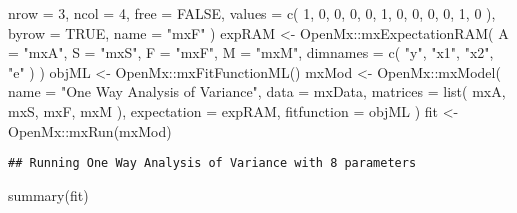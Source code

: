 \documentclass[
]{book}
\newenvironment{Shaded}{\begin{snugshade}}{\end{snugshade}}
\newcommand{\AttributeTok}[1]{\textcolor[rgb]{0.77,0.63,0.00}{#1}}
\newcommand{\ConstantTok}[1]{\textcolor[rgb]{0.00,0.00,0.00}{#1}}
\newcommand{\DecValTok}[1]{\textcolor[rgb]{0.00,0.00,0.81}{#1}}
\newcommand{\FunctionTok}[1]{\textcolor[rgb]{0.00,0.00,0.00}{#1}}
\newcommand{\NormalTok}[1]{#1}
\newcommand{\OtherTok}[1]{\textcolor[rgb]{0.56,0.35,0.01}{#1}}
\newcommand{\SpecialCharTok}[1]{\textcolor[rgb]{0.00,0.00,0.00}{#1}}
\newcommand{\StringTok}[1]{\textcolor[rgb]{0.31,0.60,0.02}{#1}}
\theoremstyle{definition}
\theoremstyle{definition}
\theoremstyle{definition}
\theoremstyle{remark}
\begin{document}
\begin{Shaded}
\begin{Highlighting}[]
  \AttributeTok{nrow =} \DecValTok{3}\NormalTok{,}
  \AttributeTok{ncol =} \DecValTok{4}\NormalTok{,}
  \AttributeTok{free =} \ConstantTok{FALSE}\NormalTok{,}
  \AttributeTok{values =} \FunctionTok{c}\NormalTok{(}
    \DecValTok{1}\NormalTok{, }\DecValTok{0}\NormalTok{, }\DecValTok{0}\NormalTok{, }\DecValTok{0}\NormalTok{,}
    \DecValTok{0}\NormalTok{, }\DecValTok{1}\NormalTok{, }\DecValTok{0}\NormalTok{, }\DecValTok{0}\NormalTok{,}
    \DecValTok{0}\NormalTok{, }\DecValTok{0}\NormalTok{, }\DecValTok{1}\NormalTok{, }\DecValTok{0}
\NormalTok{  ),}
  \AttributeTok{byrow =} \ConstantTok{TRUE}\NormalTok{,}
  \AttributeTok{name =} \StringTok{"mxF"}
\NormalTok{)}
\NormalTok{expRAM }\OtherTok{\textless{}{-}}\NormalTok{ OpenMx}\SpecialCharTok{::}\FunctionTok{mxExpectationRAM}\NormalTok{(}
  \AttributeTok{A =} \StringTok{"mxA"}\NormalTok{,}
  \AttributeTok{S =} \StringTok{"mxS"}\NormalTok{,}
  \AttributeTok{F =} \StringTok{"mxF"}\NormalTok{,}
  \AttributeTok{M =} \StringTok{"mxM"}\NormalTok{,}
  \AttributeTok{dimnames =} \FunctionTok{c}\NormalTok{(}
    \StringTok{"y"}\NormalTok{,}
    \StringTok{"x1"}\NormalTok{,}
    \StringTok{"x2"}\NormalTok{,}
    \StringTok{"e"}
\NormalTok{  )}
\NormalTok{)}
\NormalTok{objML }\OtherTok{\textless{}{-}}\NormalTok{ OpenMx}\SpecialCharTok{::}\FunctionTok{mxFitFunctionML}\NormalTok{()}
\NormalTok{mxMod }\OtherTok{\textless{}{-}}\NormalTok{ OpenMx}\SpecialCharTok{::}\FunctionTok{mxModel}\NormalTok{(}
  \AttributeTok{name =} \StringTok{"One Way Analysis of Variance"}\NormalTok{,}
  \AttributeTok{data =}\NormalTok{ mxData,}
  \AttributeTok{matrices =} \FunctionTok{list}\NormalTok{(}
\NormalTok{    mxA,}
\NormalTok{    mxS,}
\NormalTok{    mxF,}
\NormalTok{    mxM}
\NormalTok{  ),}
  \AttributeTok{expectation =}\NormalTok{ expRAM,}
  \AttributeTok{fitfunction =}\NormalTok{ objML}
\NormalTok{)}
\NormalTok{fit }\OtherTok{\textless{}{-}}\NormalTok{ OpenMx}\SpecialCharTok{::}\FunctionTok{mxRun}\NormalTok{(mxMod)}
\end{Highlighting}
\end{Shaded}

\begin{verbatim}
## Running One Way Analysis of Variance with 8 parameters
\end{verbatim}

\begin{Shaded}
\begin{Highlighting}[]
\FunctionTok{summary}\NormalTok{(fit)}
\end{Highlighting}
\end{Shaded}
\end{document}
